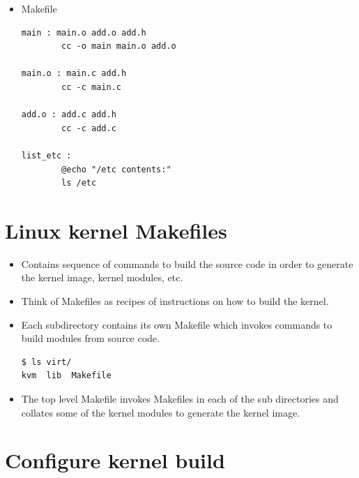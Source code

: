 \documentclass{beamer}
\begin{document}
\begin{frame}[fragile]
  \begin{itemize}
  \item Makefile
\begin{lstlisting}
main : main.o add.o add.h
        cc -o main main.o add.o

main.o : main.c add.h
        cc -c main.c

add.o : add.c add.h
        cc -c add.c

list_etc :
        @echo "/etc contents:"
        ls /etc
\end{lstlisting}
  \end{itemize}
\end{frame}

\section{Linux kernel Makefiles}

\begin{frame}[fragile]
  \begin{itemize}
  \item Contains sequence of commands to build the source code in
    order to generate the kernel image, kernel modules, etc.
  \item Think of Makefiles as recipes of instructions on how to build the
    kernel.
  \item Each subdirectory contains its own Makefile which invokes commands to
    build modules from source code.
\begin{lstlisting}
$ ls virt/
kvm  lib  Makefile
\end{lstlisting}
  \item The top level Makefile invokes Makefiles in each of the sub directories
    and collates some of the kernel modules to generate the kernel image.
  \end{itemize}
\end{frame}

\section{Configure kernel build}
\label{sec:configure-kbuild}
\end{document}
